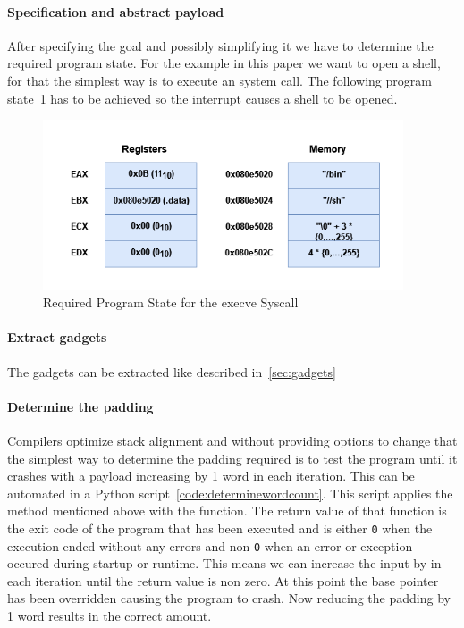 \documentclass[journal=tosc,submission, notanonymous]{iacrtrans}
\begin{document}
\paragraph{Specification and abstract payload}
\label{par:goal}
After specifying the goal and possibly simplifying it we have to determine the required program state. For the example in this paper we want to open a shell, for that the simplest way is to execute an  system call. The following program state~\cref{fig:stateforint} has to be achieved so the interrupt  causes a shell to be opened.~\cite{pixis}~\cite{proggen-rop}
\begin{figure}[h]
  \centering
  \includegraphics[width=0.95\textwidth]{requirementstackmemory.png}
  \caption{Required Program State for the execve Syscall}
  \label{fig:stateforint}
\end{figure}
\paragraph{Extract gadgets}
The gadgets can be extracted like described in~\cref{sec:gadgets}
\paragraph{Determine the padding}
\label{par:padding}
Compilers optimize stack alignment and without providing options to change that the simplest way to determine the padding required is to test the program until it crashes with a payload increasing by 1 word in each iteration. This can be automated in a Python script~\cref{code:determinewordcount}. This script applies the method mentioned above with the  function. The return value of that function is the exit code of the program that has been executed and is either \Verb+0+ when the execution ended without any errors and non \Verb+0+ when an error or exception occured during startup or runtime. This means we can increase the input by  in each iteration until the return value is non zero. At this point the base pointer  has been overridden causing the program to crash. Now reducing the padding by 1 word results in the correct amount.
\end{document}
